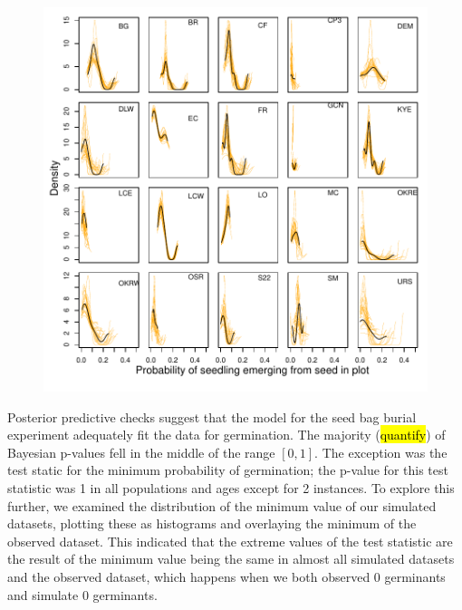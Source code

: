 \documentclass[12pt, oneside, titlepage]{article}   	%
\begin{document}
\begin{figure}[!h]
   \centering
       \includegraphics[page=1,width=1\textwidth]{../../figures/modelChecks/s0-population.pdf}  
 \label{fig:name}
\end{figure}



\clearpage
\newpage

Posterior predictive checks suggest that the model for the seed bag burial experiment adequately fit the data for germination. The majority (\hl{quantify}) of Bayesian p-values fell in the middle of the range $[0,1]$. The exception was the test static for the minimum probability of germination; the p-value for this test statistic was 1 in all populations and ages except for 2 instances. To explore this further, we examined the distribution of the minimum value of our simulated datasets, plotting these as histograms and overlaying the minimum of the observed dataset. This indicated that the extreme values of the test statistic are the result of the minimum value being the same in almost all simulated datasets and the observed dataset, which happens when we both observed 0 germinants and simulate 0 germinants.
\end{document}
